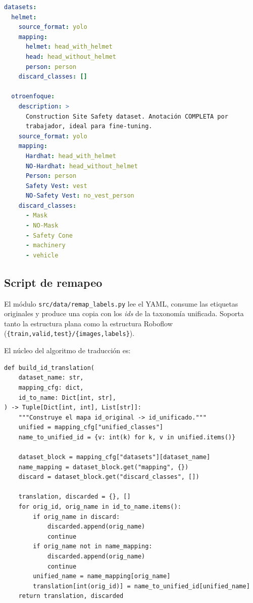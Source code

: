 \documentclass[journal,onecolumn,11pt]{IEEEtran}
\begin{document}
\begin{lstlisting}[language=yaml, caption={Fragmento de \texttt{configs/class\_mapping.yaml}.}]
datasets:
  helmet:
    source_format: yolo
    mapping:
      helmet: head_with_helmet
      head: head_without_helmet
      person: person
    discard_classes: []

  otroenfoque:
    description: >
      Construction Site Safety dataset. Anotación COMPLETA por
      trabajador, ideal para fine-tuning.
    source_format: yolo
    mapping:
      Hardhat: head_with_helmet
      NO-Hardhat: head_without_helmet
      Person: person
      Safety Vest: vest
      NO-Safety Vest: no_vest_person
    discard_classes:
      - Mask
      - NO-Mask
      - Safety Cone
      - machinery
      - vehicle
\end{lstlisting}

\subsection{Script de remapeo}

El módulo \texttt{src/data/remap\_labels.py} lee el YAML, consume
las etiquetas originales y produce una copia con los \textit{ids} de
la taxonomía unificada. Soporta tanto la estructura plana como la
estructura Roboflow (\texttt{\{train,valid,test\}/\{images,labels\}}).

El núcleo del algoritmo de traducción es:

\begin{lstlisting}[caption={\texttt{build\_id\_translation()} de \texttt{remap\_labels.py}.}]
def build_id_translation(
    dataset_name: str,
    mapping_cfg: dict,
    id_to_name: Dict[int, str],
) -> Tuple[Dict[int, int], List[str]]:
    """Construye el mapa id_original -> id_unificado."""
    unified = mapping_cfg["unified_classes"]
    name_to_unified_id = {v: int(k) for k, v in unified.items()}

    dataset_block = mapping_cfg["datasets"][dataset_name]
    name_mapping = dataset_block.get("mapping", {})
    discard = dataset_block.get("discard_classes", [])

    translation, discarded = {}, []
    for orig_id, orig_name in id_to_name.items():
        if orig_name in discard:
            discarded.append(orig_name)
            continue
        if orig_name not in name_mapping:
            discarded.append(orig_name)
            continue
        unified_name = name_mapping[orig_name]
        translation[int(orig_id)] = name_to_unified_id[unified_name]
    return translation, discarded
\end{lstlisting}
\end{document}
